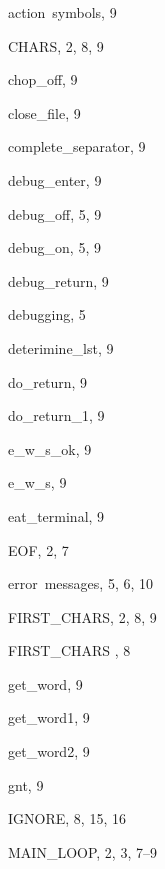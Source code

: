 \begin{theindex}

  \item {action\ symbols}, 9

  \indexspace

  \item {\ptt CHARS}, 2, 8, 9
  \item {\ptt chop\_off}, 9
  \item {\ptt close\_file}, 9
  \item {\ptt complete\_separator}, 9

  \indexspace

  \item {\ptt debug\_enter}, 9
  \item {\ptt debug\_off}, 5, 9
  \item {\ptt debug\_on}, 5, 9
  \item {\ptt debug\_return}, 9
  \item debugging, 5
  \item {\ptt deterimine\_lst}, 9
  \item {\ptt do\_return}, 9
  \item {\ptt do\_return\_1}, 9

  \indexspace

  \item {\ptt e\_w\_s\_ok}, 9
  \item {\ptt e\_w\_s}, 9
  \item {\ptt eat\_terminal}, 9
  \item {\ptt EOF}, 2, 7
  \item error\ messages, 5, 6, 10

  \indexspace

  \item {\ptt FIRST\_CHARS}, 2, 8, 9
  \item {\ptt FIRST\_CHARS}    , 8

  \indexspace

  \item {\ptt get\_word}, 9
  \item {\ptt get\_word1}, 9
  \item {\ptt get\_word2}, 9
  \item {\ptt gnt}, 9

  \indexspace

  \item {\ptt IGNORE}, 8, 15, 16

  \indexspace

  \item {\ptt MAIN\_LOOP}, 2, 3, 7--9


\end{theindex}
